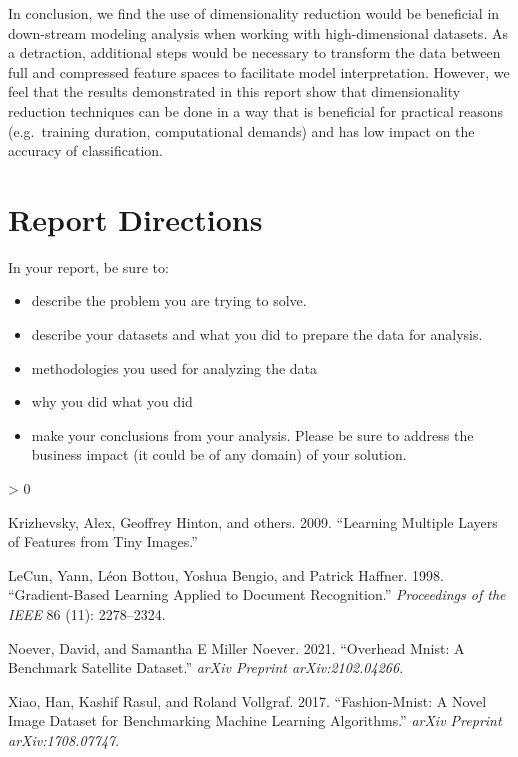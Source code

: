 \documentclass{article}
\newlength{\cslhangindent}
\newenvironment{CSLReferences}[2] %
 {%
  \setlength{\parindent}{0pt}
  \ifodd #1 \everypar{\setlength{\hangindent}{\cslhangindent}}\ignorespaces\fi
  \ifnum #2 > 0
  \setlength{\parskip}{#2\baselineskip}
  \fi
 }%
 {}
\begin{document}
In conclusion, we find the use of dimensionality reduction would be
beneficial in down-stream modeling analysis when working with
high-dimensional datasets. As a detraction, additional steps would be
necessary to transform the data between full and compressed feature
spaces to facilitate model interpretation. However, we feel that the
results demonstrated in this report show that dimensionality reduction
techniques can be done in a way that is beneficial for practical reasons
(e.g.~training duration, computational demands) and has low impact on
the accuracy of classification.

\hypertarget{report-directions}{%
\section{Report Directions}\label{report-directions}}

In your report, be sure to:

\begin{itemize}
\item
  describe the problem you are trying to solve.
\item
  describe your datasets and what you did to prepare the data for
  analysis.
\item
  methodologies you used for analyzing the data
\item
  why you did what you did
\item
  make your conclusions from your analysis. Please be sure to address
  the business impact (it could be of any domain) of your solution.
\end{itemize}

\hypertarget{refs}{}
\begin{CSLReferences}{1}{0}
\leavevmode\hypertarget{ref-krizhevsky2009learning}{}%
Krizhevsky, Alex, Geoffrey Hinton, and others. 2009. {``Learning
Multiple Layers of Features from Tiny Images.''}

\leavevmode\hypertarget{ref-lecun1998gradient}{}%
LeCun, Yann, Léon Bottou, Yoshua Bengio, and Patrick Haffner. 1998.
{``Gradient-Based Learning Applied to Document Recognition.''}
\emph{Proceedings of the IEEE} 86 (11): 2278--2324.

\leavevmode\hypertarget{ref-noever2021overhead}{}%
Noever, David, and Samantha E Miller Noever. 2021. {``Overhead Mnist: A
Benchmark Satellite Dataset.''} \emph{arXiv Preprint arXiv:2102.04266}.

\leavevmode\hypertarget{ref-xiao2017fashion}{}%
Xiao, Han, Kashif Rasul, and Roland Vollgraf. 2017. {``Fashion-Mnist: A
Novel Image Dataset for Benchmarking Machine Learning Algorithms.''}
\emph{arXiv Preprint arXiv:1708.07747}.

\end{CSLReferences}



\end{document}
